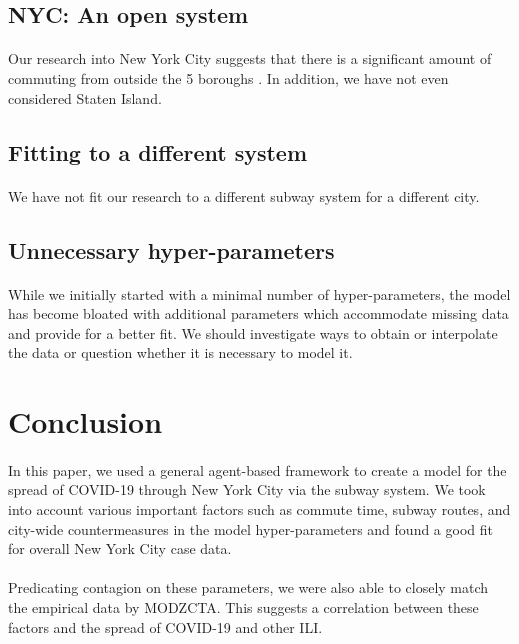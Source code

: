 \documentclass[12pt, a4, epsf] {article}
\theoremstyle{plain}
\theoremstyle{definition}
\begin{document}
\subsection{NYC: An open system}
\paragraph{}
Our research into New York City suggests that there is a significant amount of commuting from outside the 5 boroughs \cite{nyc_commuting}. In addition, we have not even considered Staten Island.
\subsection{Fitting to a different system}
\paragraph{}
We have not fit our research to a different subway system for a different city.
\subsection{Unnecessary hyper-parameters}
\paragraph{}
While we initially started with a minimal number of hyper-parameters, the model has become bloated with additional parameters which accommodate missing data and provide for a better fit. We should investigate ways to obtain or interpolate the data or question whether it is necessary to model it.
\section{Conclusion}
\paragraph{}
In this paper, we used a general agent-based framework to create a model for the spread of COVID-19 through New York City via the subway system. We took into account various important factors such as commute time, subway routes, and city-wide countermeasures in the model hyper-parameters and found a good fit for overall New York City case data.
\paragraph{}
Predicating contagion on these parameters, we were also able to closely match the empirical data by MODZCTA. This suggests a correlation between these factors and the spread of COVID-19 and other ILI.
\nocite{*}
{}

\end{document}
